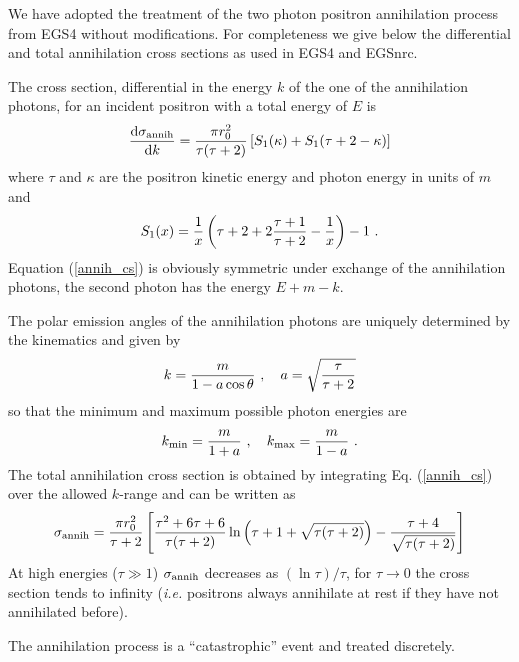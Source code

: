 We have adopted the treatment
of the two photon positron annihilation process  from
EGS4 without modifications. For completeness
we give below the differential and total annihilation
cross sections as used in EGS4 and EGSnrc.

The cross
section, differential in the energy $k$ of the one
of the annihilation photons, for an incident positron with
a total energy of $E$ is \cite{Ne85}
\begin{equation}
\label{annih_cs}
{{\rm d} \sigma_{\rm annih} \over {\rm d} k} = {\pi r_0^2 \over \tau
(\tau+2)} \left[ S_1(\kappa) + S_1(\tau + 2 - \kappa) \right]
\end{equation}
where $\tau$ and $\kappa$ are the positron kinetic energy and photon
energy in units of $m$ and
\begin{equation}
S_1(x) = \frac{1}{x} \left( \tau + 2 + 2 {\tau + 1 \over \tau + 2} -
\frac{1}{x} \right) - 1~.
\end{equation}
Equation (\ref{annih_cs}) is obviously symmetric
under exchange of the annihilation photons,
the second photon has the energy $E + m - k$.

The polar emission angles of the annihilation photons are uniquely
determined by the kinematics and given by \cite{Ne85}
\begin{equation}
\label{annih_k_theta}
k = { m \over 1 - a \cos \theta}~,
\quad a = \sqrt{{\tau \over \tau + 2}}
\end{equation}
so that the minimum and maximum possible photon energies are
\begin{equation}
\label{annih_kminmax}
k_{\rm min} = {m \over 1 + a} ~, \quad
k_{\rm max} = {m \over 1 - a}~.
\end{equation}
The total annihilation cross section
is obtained by integrating Eq. (\ref{annih_cs})
over the allowed $k$-range and can be written as
\begin{equation}
\sigma_{\rm annih} = {\pi r_0^2 \over \tau + 2} \left[
{\tau^2 + 6 \tau + 6 \over \tau (\tau + 2)} \ln\left(\tau + 1
+ \sqrt{\tau (\tau + 2)} \right) - {\tau + 4 \over \sqrt{\tau (\tau + 2)}}
\right]
\end{equation}
At high energies ($\tau \gg 1$) $\sigma_{\rm annih}$
decreases as $(\ln \tau)/\tau$, for $\tau \to 0$ the cross section
tends to infinity ({\em i.e.} positrons always annihilate at rest
if they have not annihilated before).

The annihilation process is a ``catastrophic'' event and
treated discretely.


